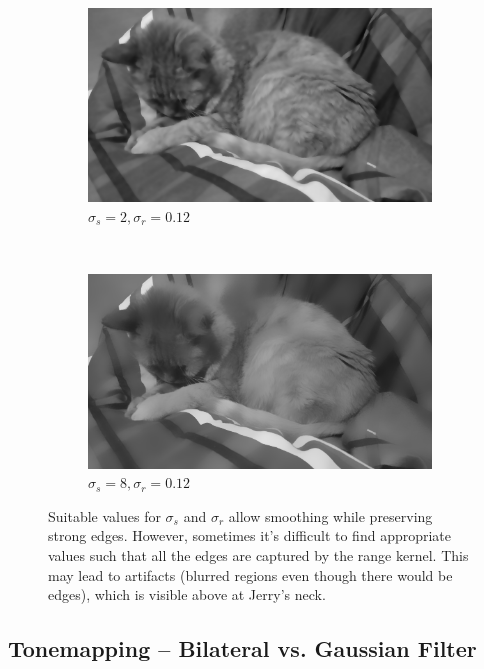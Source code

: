 \documentclass[a4spaper]{article}
\begin{document}
\begin{figure}[ht]
	\vspace{2mm}
	\begin{subfigure}[h]{0.48\textwidth}
		\centering
		\includegraphics[width=\textwidth]{jerry_flt_2_0-12}
		\caption*{$\sigma_s = 2, \sigma_r = 0.12$}
	\end{subfigure}
	~ 
	\begin{subfigure}[h]{0.48\textwidth}
		\centering
		\includegraphics[width=\textwidth]{jerry_flt_8_0-12}
		\caption*{$\sigma_s = 8, \sigma_r = 0.12$}
	\end{subfigure}
\caption{Suitable values for $\sigma_s$ and $\sigma_r$ allow smoothing while preserving strong edges. However, sometimes it's difficult to find appropriate values such that all the edges are captured by the range kernel. This may lead to artifacts (blurred regions even though there would be edges), which is visible above at Jerry's neck.}
\label{fig:edge-preserving-smoothing}
\end{figure}

\subsection*{Tonemapping -- Bilateral vs. Gaussian Filter}
\end{document}
